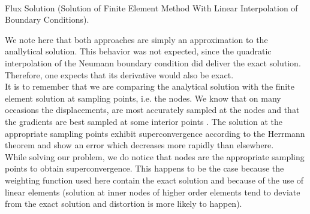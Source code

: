 \documentclass[a4paper,12pt]{article}
\makeatletter
\newenvironment{figurehere}
  {\def\@captype{figure}}
  {}
\makeatother
\begin{document}
\begin{center}
\begin{figurehere} 
\\
\caption{Flux Solution (Solution of Finite Element Method With Linear Interpolation of Boundary Conditions).}\label{fig:fluxlin}
\end{figurehere}
\end{center}
We note here that both approaches are simply an approximation to the anallytical solution. This behavior was not expected, since the quadratic interpolation of the Neumann boundary condition did deliver the exact solution. Therefore, one expects that its derivative would also be exact. \\
It is to remember that we are comparing the analytical solution with the finite element solution at sampling points, i.e. the nodes. We know that on many occasions the displacements, are most accurately sampled at the nodes and that the gradients are best sampled at some interior points \cite{TaylorZienkiewicz}. The solution at the appropriate sampling points exhibit superconvergence according to the Herrmann theorem and show an error which decreases more rapidly than elsewhere.\\
While solving our problem, we do notice that nodes are the appropriate sampling points to obtain superconvergence. This happens to be the case because the weighting function used here contain the exact solution and because of the use of linear elements (solution at inner nodes of higher order elements tend to deviate from the exact solution and distortion is more likely to happen). \\
\end{document}
